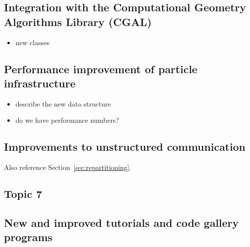 \documentclass{ansarticle-preprint}
\begin{document}
\subsection{Integration with the Computational Geometry Algorithms
  Library (CGAL)}\label{sec:cgal}

\begin{itemize}
\item new classes
\end{itemize}

\subsection{Performance improvement of particle infrastructure}\label{sec:particles}

\begin{itemize}
\item describe the new data structure
\item do we have performance numbers?
\end{itemize}



\subsection{Improvements to unstructured communication}
\label{sec:CA}


Also reference Section~\ref{sec:repartitioning}.


\subsection{Topic 7}



\subsection{New and improved tutorials and code gallery programs}
\label{subsec:steps}
\end{document}
